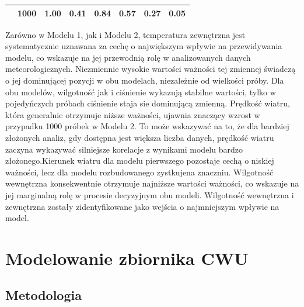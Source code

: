 \documentclass[a4paper,twoside,12pt]{book}
\begin{document}
\begin{table}[!h]
{\begin{tabular}{|c|c|c|c|c|c|c|c|}
			                                                                   & 1000                                                   & 1.00                                                              & 0.41                                                             & 0.84                                                              & 0.57                                                      & 0.27                                                      & 0.05                                                            \\ \hline
		\end{tabular}
	}
\end{table}

Zarówno w Modelu 1, jak i Modelu 2, temperatura zewnętrzna jest systematycznie uznawana za cechę o największym wpływie na przewidywania modelu, co wskazuje na jej przewodnią rolę w analizowanych danych meteorologicznych. Niezmiennie wysokie wartości ważności tej zmiennej świadczą o jej dominującej pozycji w obu modelach, niezależnie od wielkości próby. Dla obu modelów, wilgotność jak i ciśnienie wykazują stabilne wartości, tylko w pojedyńczych próbach ciśnienie staja sie dominującą zmienną.
Prędkość wiatru, która generalnie otrzymuje niższe ważności, ujawnia znaczący wzrost w przypadku 1000 próbek w Modelu 2. To może wskazywać na to, że dla bardziej złożonych analiz, gdy dostępna jest większa liczba danych, prędkość wiatru zaczyna wykazywać silniejsze korelacje z wynikami modelu bardzo złożonego.Kierunek wiatru dla modelu pierwszego pozostaje cechą o niskiej ważności, lecz dla modelu rozbudowanego zystkujena znaczniu. Wilgotność wewnętrzna konsekwentnie otrzymuje najniższe wartości ważności, co wskazuje na jej marginalną rolę w procesie decyzyjnym obu modeli. Wilgotność wewnętrzna i zewnętrzna zostały zidentyfikowane jako wejścia o najmniejszym wpływie na model.

\chapter{Modelowanie zbiornika CWU}
\label{ch:05}
\section{Metodologia}
\end{document}
